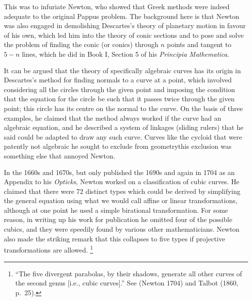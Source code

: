 This was to infuriate Newton,
%
 who showed that Greek methods were
indeed adequate to the original Pappus problem. The background here
is that Newton was also engaged in demolishing Descartes's theory of
planetary motion
%
in favour of his own, which led him into the theory
of conic sections and to pose and solve the problem of finding
the conic (or conics) through $n$ points and tangent to $5-n$
lines, which he did in Book I, Section 5 of his \emph{Principia
Mathematica}.
\label{Newtonconics}

It can be argued that the theory of specifically algebraic curves has its
origin in Descartes's method for finding normals
%
to a curve at a point,
which  involved considering all the circles through the given point and
imposing the condition that the equation for the circle be such that it
passes twice through the given point; this circle has its centre on the
normal to the curve. On the basis of three examples, he claimed that
the method always worked  if the curve had an algebraic equation, and
he described a system of linkages
%
(sliding rulers) that he said could
be adapted to draw any such curve. Curves like the cycloid
%
that were
patently not algebraic he sought to exclude from geometry\emdash this
exclusion was something else that annoyed Newton.

In the 1660s and 1670s, but only published  the 1690s and again in
1704 as an Appendix to his \emph{Opticks}, Newton worked on a
classification of cubic curves.
%
 He claimed that there were 72 distinct
types which could be derived by simplifying the general equation using
what we would call affine or linear transformations, although at one
point he used a simple birational transformation. For some reason, in
writing up his work for publication he omitted four of the possible
cubics, and they were speedily found by various other mathematicians.
Newton also made the striking remark that this collapses to five types
if projective transformations
%
are allowed.%
\footnote{``The five divergent parabolas, by their shadows, generate
  all other curves of the second genus [i.e., cubic curves].'' See
  (Newton  1704) and Talbot (1860, p.~25).}





